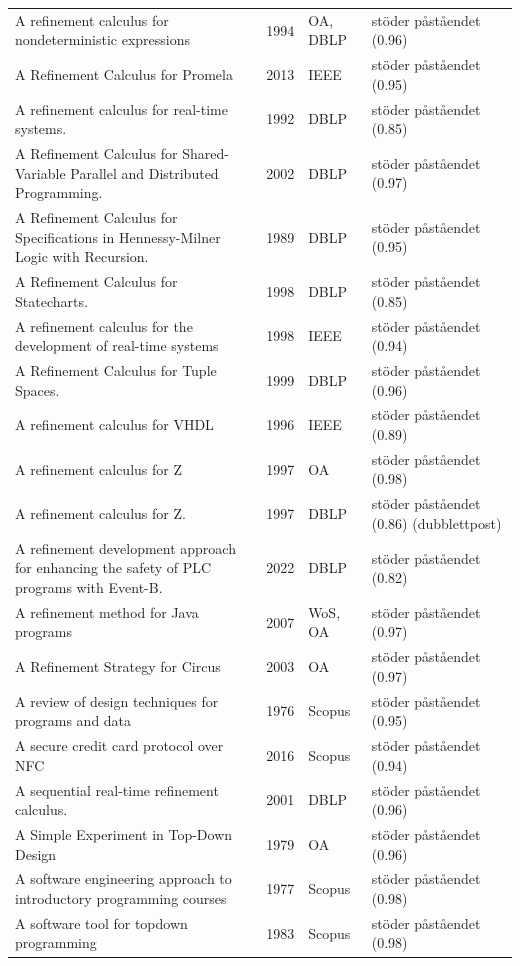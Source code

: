 \begin{longtable}{@{}%
  >{\raggedright\arraybackslash}p{}c%
  >{\raggedright\arraybackslash}p{}%
  >{\raggedright\arraybackslash}p{}@{}}
A refinement calculus for nondeterministic expressions & 1994 & OA, DBLP & stöder påståendet (0.96) \\
A Refinement Calculus for Promela & 2013 & IEEE & stöder påståendet (0.95) \\
A refinement calculus for real-time systems. & 1992 & DBLP & stöder påståendet (0.85) \\
A Refinement Calculus for Shared-Variable Parallel and Distributed Programming. & 2002 & DBLP & stöder påståendet (0.97) \\
A Refinement Calculus for Specifications in Hennessy-Milner Logic with Recursion. & 1989 & DBLP & stöder påståendet (0.95) \\
A Refinement Calculus for Statecharts. & 1998 & DBLP & stöder påståendet (0.85) \\
A refinement calculus for the development of real-time systems & 1998 & IEEE & stöder påståendet (0.94) \\
A Refinement Calculus for Tuple Spaces. & 1999 & DBLP & stöder påståendet (0.96) \\
A refinement calculus for VHDL & 1996 & IEEE & stöder påståendet (0.89) \\
A refinement calculus for Z & 1997 & OA & stöder påståendet (0.98) \\
A refinement calculus for Z. & 1997 & DBLP & stöder påståendet (0.86) (dubblettpost) \\
A refinement development approach for enhancing the safety of PLC programs with Event-B. & 2022 & DBLP & stöder påståendet (0.82) \\
A refinement method for Java programs & 2007 & WoS, OA & stöder påståendet (0.97) \\
A Refinement Strategy for Circus & 2003 & OA & stöder påståendet (0.97) \\
A review of design techniques for programs and data & 1976 & Scopus & stöder påståendet (0.95) \\
A secure credit card protocol over NFC & 2016 & Scopus & stöder påståendet (0.94) \\
A sequential real-time refinement calculus. & 2001 & DBLP & stöder påståendet (0.96) \\
A Simple Experiment in Top-Down Design & 1979 & OA & stöder påståendet (0.96) \\
A software engineering approach to introductory programming courses & 1977 & Scopus & stöder påståendet (0.98) \\
A software tool for topdown programming & 1983 & Scopus & stöder påståendet (0.98) \\

\end{longtable}
